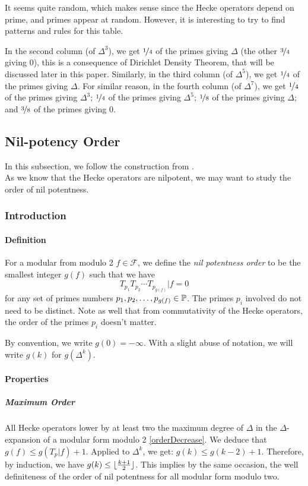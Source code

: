 It seems quite random, which makes sense since the Hecke operators depend on prime, and primes appear at random.
However, it is interesting to try to find patterns and rules for this table.

In the second column (of $\Delta^3$), we get $\nicefrac{1}{4}$ of the primes giving $\Delta$ (the other $\nicefrac{3}{4}$ giving $0$), this is a consequence of Dirichlet Density Theorem, that will be discussed later in this paper.
Similarly, in the third column (of $\Delta^5$), we get $\nicefrac{1}{4}$ of the primes giving $\Delta$.
For similar reason, in the fourth column (of $\Delta^7$), we get $\nicefrac{1}{4}$ of the primes giving $\Delta^3$; $\nicefrac{1}{4}$ of the primes giving $\Delta^5$; $\nicefrac{1}{8}$ of the primes giving $\Delta$; and $\nicefrac{3}{8}$ of the primes giving $0$.



\subsection{Nil-potency Order}
In this subsection, we follow the construction from \cite{OrdreNilpotenceOperateurHecke}.\\
As we know that the Hecke operators are nilpotent, we may want to study the order of nil potentness.
\subsubsection{Introduction}
\paragraph{Definition}
For a modular from modulo 2 $f \in \mathcal{F}$, we define the \textit{nil potentness order} to be the smallest integer $g(f)$ such that we have 
$$
T_{p_1} T_{p_2} \cdots T_{p_{g(f)}} | f = 0
$$
for any set of primes numbers $p_1, p_2, \dots, p_{g(f)} \in \mathbb{P}$.
The primes $p_i$ involved do not need to be distinct.
Note as well that from commutativity of the Hecke operators, the order of the primes $p_i$ doesn't matter.

By convention, we write $g(0)= -\infty$.
With a slight abuse of notation, we will write $g(k)$ for $g(\Delta^k)$.

\paragraph{Properties}
\subparagraph[Well-definiteness]{Maximum Order}
\label{MaximumOrderNilpotencyHeckeOperators}
All Hecke operators lower by at least two the maximum degree of $\Delta$ in the $\Delta$-expansion of a modular form modulo 2 \ref{orderDecrease}.
We deduce that $g(f) \leq g(T_p|f) + 1$.
Applied to $\Delta^k$, we get: $g(k) \leq g(k-2) + 1$.
Therefore, by induction, we have $g(k) \leq \lfloor \frac{k+1}{2} \rfloor$.
This implies by the same occasion, the well definiteness of the order of nil potentness for all modular form modulo two.

